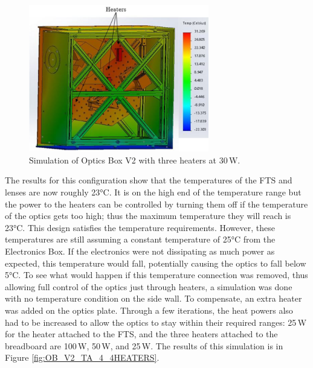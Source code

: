 \begin{figure}
    \centering
    \includegraphics[width=0.7\textwidth]{chap3_images/LIFE_V2_images/TA_25_-20_no_front_wall_three_heaters_labelled_FIXED.png}
    \caption{Simulation of Optics Box V2 with three heaters at 30\,W.}
    \label{fig:OB_V2_TA_3_3HEATERS}
\end{figure}

The results for this configuration show that the temperatures of the FTS and lenses are now roughly 23°C. It is on the high end of the temperature range but the power to the heaters can be controlled by turning them off if the temperature of the optics gets too high; thus the maximum temperature they will reach is 23°C. This design satisfies the temperature requirements. However, these temperatures are still assuming a constant temperature of 25°C from the Electronics Box. If the electronics were not dissipating as much power as expected, this temperature would fall, potentially causing the optics to fall below 5°C. To see what would happen if this temperature connection was removed, thus allowing full control of the optics just through heaters, a simulation was done with no temperature condition on the side wall. To compensate, an extra heater was added on the optics plate. Through a few iterations, the heat powers also had to be increased to allow the optics to stay within their required ranges: 25\,W for the heater attached to the FTS, and the three heaters attached to the breadboard are 100\,W, 50\,W, and 25\,W. The results of this simulation is in Figure \ref{fig:OB_V2_TA_4_4HEATERS}.

